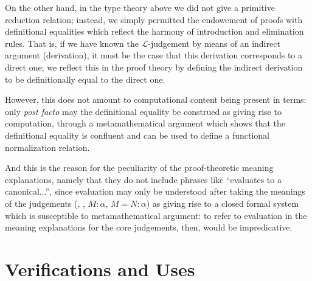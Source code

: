 \documentclass[main.tex]{subfiles}
\begin{document}
On the other hand, in the type theory above we did not give a primitive
reduction relation; instead, we simply permitted the endowement of proofs
with definitional equalities which reflect the harmony of introduction and
elimination rules. That is, if we have known the $\mathcal{L}$-judgement
 by means of an indirect argument (derivation), it must be the case
that this derivation corresponds to a direct one; we reflect this in the
proof theory by defining the indirect derivation to be definitionally equal to
the direct one.

However, this does not amount to computational content being present in terms:
only \emph{post facto} may the definitional equality be construed as giving
rise to computation, through a metamathematical argument which shows that the
definitional equality is confluent and can be used to define a functional
normalization relation.

And this is the reason for the peculiarity of the proof-theoretic meaning
explanations, namely that they do not include phrases like ``evaluates to a
canonical...'', since evaluation may only be understood after taking the
meanings of the judgements (\type\alpha, \type{\alpha=\beta}, $M:\alpha$,
$M=N:\alpha$) as giving rise to a closed formal system which is susceptible to
metamathematical argument: to refer to evaluation in the meaning explanations
for the core judgements, then, would be impredicative.

\section{Verifications and Uses}
\end{document}
